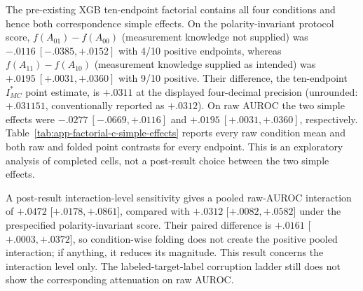 
The pre-existing XGB ten-endpoint factorial contains all four conditions and hence
both correspondence simple effects.  On the polarity-invariant protocol
score, $f(A_{01})-f(A_{00})$ (measurement knowledge not supplied) was
$-.0116~[-.0385,+.0152]$ with 4/10 positive endpoints, whereas
$f(A_{11})-f(A_{10})$ (measurement knowledge supplied as intended) was
$+.0195~[+.0031,+.0360]$ with 9/10 positive.  Their difference, the
ten-endpoint $I^*_{MC}$ point estimate, is $+.0311$ at the displayed
four-decimal precision (unrounded: $+.031151$, conventionally reported as
$+.0312$).  On raw AUROC the two
simple effects were $-.0277~[-.0669,+.0116]$ and
$+.0195~[+.0031,+.0360]$, respectively.  Table~\ref{tab:app-factorial-c-simple-effects}
reports every raw condition mean and both raw and folded point contrasts for every
endpoint.  This is an exploratory analysis of completed cells, not a
post-result choice between the two simple effects.

A post-result interaction-level sensitivity gives a pooled raw-AUROC
interaction of $+.0472$ [$+.0178,+.0861$], compared with $+.0312$
[$+.0082,+.0582$] under the prespecified polarity-invariant score. Their paired
difference is $+.0161$ [$+.0003,+.0372$], so condition-wise folding does not
create the positive pooled interaction; if anything, it reduces its magnitude.
This result concerns the interaction level only. The labeled-target-label
corruption ladder still does not show the corresponding attenuation on raw
AUROC.

